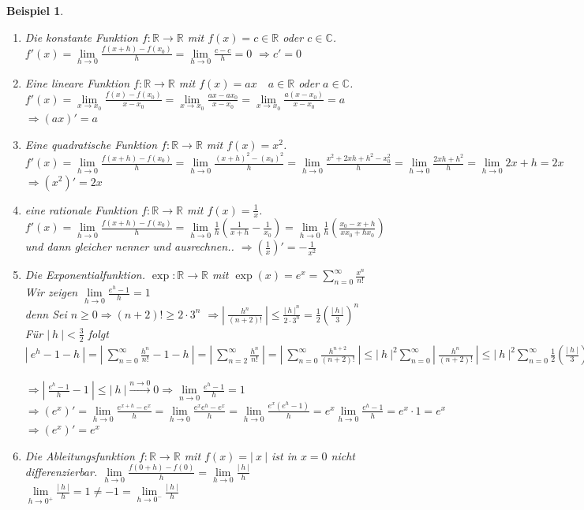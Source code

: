 \documentclass[a4paper,titlepage,oneside]{article}
\def\C{\ensuremath{\mathbb{C}} }
\def\R{\ensuremath{\mathbb{R}} }
\def\e{\ensuremath{\mathit{e}} }
\newcommand{\suminf}[2][n]{\ensuremath{\sum_{#1= 0}^{\infty}{#2}}}
\newcommand{\limnull}[2][n]{\ensuremath{\lim\limits_{#1 \rightarrow 0}{#2}}}
\newcommand{\limAB}[3][x]{\ensuremath{\lim\limits_{#1 \rightarrow #2}{#3}}}
\newcommand{\limA}[2][x_0]{\limAB{#1}{#2}}
\newcommand{\limpos}[3][n]{\ensuremath{\lim\limits_{#1 \rightarrow #2^+}{#3}}}
\newcommand{\limneg}[3][n]{\ensuremath{\lim\limits_{#1 \rightarrow #2^-}{#3}}}
\newcommand{\abs}[1]{\ensuremath{\left|\:#1\:\right|}}
\newcommand{\longtonull}[1][n]{\ensuremath{\overset{\scriptscriptstyle{#1 \to 0}}{\longrightarrow}}}
\theoremstyle{thmstyle}
\newtheorem{bsp}[satz]{Beispiel}
\theoremstyle{subthmstyle}
\begin{document}
\begin{bsp}
\begin{enumerate}
\item Die konstante Funktion
$f: \R \to \R$ mit $ f(x) = c \in \R $ oder $ c \in \C $. $f'(x) = \limnull[h]{\frac{f(x + h) - f(x_0)}{h}} = \limnull[h]{\frac{c-c}{h}} = 0$
$\Rightarrow c' = 0$
\item Eine lineare Funktion
$f: \R \to \R$ mit $ f(x) = ax \quad a \in \R $ oder $ a \in \C $. $f'(x) = \limA{\frac{f(x) - f(x_0)}{x-x_0}} = \limA{\frac{ax - ax_0}{x-x_0}} = \limA{\frac{a(x-x_0)}{x-x_0}} = a$
$\Rightarrow (ax)' = a$
\item Eine quadratische Funktion
$f: \R \to \R$ mit $ f(x) = x^2 $. $f'(x) = \limnull[h]{\frac{f(x + h) - f(x_0)}{h}} = \limnull[h]{\frac{(x + h)^2 - (x_0)^2}{h}} = \limnull[h]{\frac{x^2 + 2xh + h^2 - x_0^2}{h}} =  \limnull[h]{\frac{2xh + h^2}{h}} = \limnull[h]{2x + h}  = 2x$
$\Rightarrow (x^2)' = 2x$
\item eine rationale Funktion
$f: \R \to \R$ mit $ f(x) = \frac{1}{x} $. $f'(x) = \limnull[h]{\frac{f(x + h) - f(x_0)}{h}} = \limnull[h]{\frac{1}{h}\left(\frac{1}{x + h} - \frac{1}{x_0}\right)} = \limnull[h]{\frac{1}{h}\left(\frac{x_0- x +h}{xx_0 + hx_0}\right)} $ und dann gleicher nenner und ausrechnen..
$\Rightarrow \left(\frac{1}{x}\right)' = -\frac{1}{x^2}$
\item Die Exponentialfunktion.
$\exp: \R \to \R$ mit $\exp(x) = \e^x = \suminf{\frac{x^n}{n!}}$ \\
Wir zeigen $\limnull[h]{\frac{e^h - 1}{h}} = 1$\\
denn Sei $n \ge 0 \Rightarrow (n+2)! \ge 2 \cdot 3^n$
$\Rightarrow \abs{\frac{h^n}{(n+2)!}} \le \frac{\abs{h}^n}{2\cdot 3^n} = \frac{1}{2}\left(\frac{\abs{h}}{3}\right)^n$\\
Für $\displaystyle \abs{h} < \frac{3}{2}$ folgt $ \abs{\e^h - 1 - h} = \abs{\suminf{\frac{h^n}{n!}} - 1- h} = \abs{\sum_{n=2}^{\infty}{\frac{h^n}{n!}}} = \abs{\suminf{\frac{h^{n+2}}{(n+2)!}}} \le \abs{h}^2 \suminf{\abs{\frac{h^n}{(n+2)!}}} \le \abs{h}^2\suminf{\frac{1}{2}\left(\frac{\abs{h}}{3}\right)^h} = \frac{\abs{h}^2}{2}\suminf{\underbrace{\left(\frac{\abs{h}}{3}\right)^h}_{<1}} \overset{\text{geometrische Reihe}}{=} = \frac{\abs{h}^2}{2} \frac{1}{1-\underbrace{\frac{\abs{h}}{3}}_{< \frac{1}{2}}} \le \abs{h^2}$\\
$\Rightarrow \abs{\frac{e^h - 1}{h} - 1} \le \abs{h} \longtonull 0 \Rightarrow \limnull{\frac{e^h - 1}{h}} = 1$ \\
$\Rightarrow (\e^x)' = \limnull[h]{\frac{\e^{x+h} - \e^x}{h}} = \limnull[h]{\frac{\e^x\e^h-\e^x}{h}} = \limnull[h]{\frac{\e^x(\e^h-1)}{h}} = \e^x\limnull[h]{\frac{\e^h-1}{h}} = \e^x \cdot 1 = \e^x$\\
$\Rightarrow (\e^x)' = \e^x $
\item Die Ableitungsfunktion
$f: \R \to \R$ mit $ f(x) = \abs{x} $ ist in $ x = 0$ nicht differenzierbar. $\limnull[h]{\frac{f(0 + h) - f(0)}{h}} = \limnull[h]{\frac{\abs{h}}{h}}$\\
$\limpos[h]{0}{\frac{\abs{h}}{h}} = 1 \ne -1 = \limneg[h]{0}{\frac{\abs{h}}{h}}$
\end{enumerate}
\end{bsp}
\end{document}
